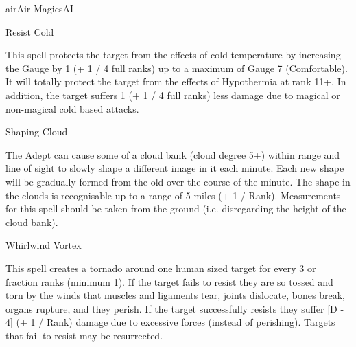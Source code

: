 \begin{College}[2.1]{air}{Air Magics}{AI}
\begin{spell}[S-12]{Resist Cold}

\begin{effects}
This spell protects the target from the effects of cold temperature by
increasing the Gauge by 1 (+ 1 / 4 full ranks) up to a maximum of
Gauge 7 (Comfortable).  It will totally protect the target from the
effects of Hypothermia at rank 11+.  In addition, the target suffers 1
(+ 1 / 4 full ranks) less damage due to magical or non-magical cold
based attacks.
\end{effects}
\end{spell}

\begin{spell}[S-13]{Shaping Cloud}

\begin{effects}
The Adept can cause some of a cloud bank (cloud degree 5+) within
range and line of sight to slowly shape a different image in it each
minute.  Each new shape will be gradually formed from the old over the
course of the minute. The shape in the clouds is recognisable up to a
range of 5 miles (+ 1 / Rank).  Measurements for this spell should be
taken from the ground (i.e. disregarding the height of the cloud
bank).
\end{effects}
\end{spell}

\begin{spell}[S-14]{Whirlwind Vortex}

\begin{effects}
This spell creates a tornado around one human sized target for every 3
or fraction ranks (minimum 1). If the target fails to resist they are
so tossed and torn by the winds that muscles and ligaments tear,
joints dislocate, bones break, organs rupture, and they perish.  If
the target successfully resists they suffer [D - 4] (+ 1 / Rank)
damage due to excessive forces (instead of perishing).  Targets that
fail to resist may be resurrected.
\end{effects}
\end{spell}


\end{College}
